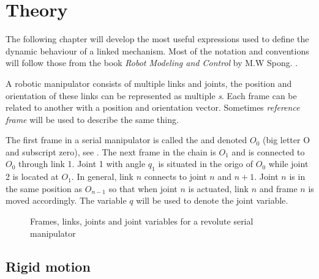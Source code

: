\chapter{Theory}\label{secTheory}


The following chapter will develop the most useful expressions used to define the dynamic behaviour of a linked mechanism. Most of the notation and conventions will follow those from the book \textit{Robot Modeling and Control} by M.W Spong. \cite{spong}.

A robotic manipulator consists of multiple links and joints, the position and orientation of these links can be represented as multiple \textit{s}. Each \gls{frame} can be related to another with a position and orientation vector. Sometimes \textit{reference frame} will be used to describe the same thing.

The first frame in a serial manipulator is called the  and denoted $O_0$ (big letter O and subscript zero), see . The next frame in the chain is $O_1$ and is connected to $O_0$ through link 1. Joint 1 with angle $q_1$ is situated in the origo of $O_0$ while joint 2 is located at $O_1$. In general, link $n$ connects to joint $n$ and $n+1$. Joint $n$ is in the same position as $O_{n-1}$ so that when joint $n$ is actuated, link $n$ and frame $n$ is moved accordingly. The variable $q$ will be used to denote the joint variable.

\begin{figure}[h!]    
    \centering           
    \def\svgwidth{.9\columnwidth}
    
    \caption{Frames, links, joints and joint variables for a revolute serial manipulator}
    \label{frames}
\end{figure}
\restoregeometry


\section{Rigid motion}
